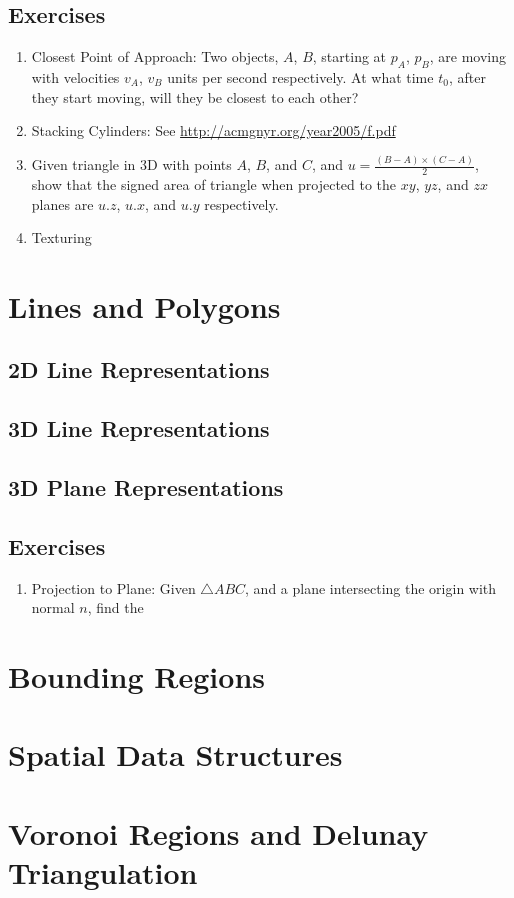 \documentclass[12pt]{report}
\begin{document}
	
\section{Exercises}
\begin{enumerate}
	\item Closest Point of Approach: Two objects, $A$, $B$, starting at $p_A$, $p_B$, are moving with velocities $v_A$, $v_B$ units per second respectively. At what time $t_0$, after they start moving, will they be closest to each other?
	\item Stacking Cylinders: See \url{http://acmgnyr.org/year2005/f.pdf}
	\item Given triangle in 3D with points $A$, $B$, and $C$, and $u = \frac{(B - A)\times (C - A)}{2}$, show that the signed area of triangle when projected to the $xy$, $yz$, and $zx$ planes are $u.z$, $u.x$, and $u.y$ respectively.
	\item Texturing
\end{enumerate}
\chapter{Lines and Polygons}
\section{2D Line Representations}
\section{3D Line Representations}
\section{3D Plane Representations}
\section{Exercises}
\begin{enumerate}
	\item Projection to Plane: Given $\triangle ABC$, and a plane intersecting the origin with normal $n$, find the 
\end{enumerate}
\chapter{Bounding Regions}
\chapter{Spatial Data Structures}
\chapter{Voronoi Regions and Delunay Triangulation}
\end{document}
